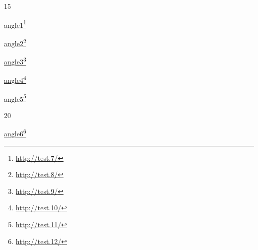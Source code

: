 15

\href{http://test.7/}{angle1}\footnote{\href{http://test.7/}{http://test.7/}}

\href{http://test.8/}{angle2}\footnote{\href{http://test.8/}{http://test.8/}}

\href{http://test.9/}{angle3}\footnote{\href{http://test.9/}{http://test.9/}}

\href{http://test.10/}{angle4}\footnote{\href{http://test.10/}{http://test.10/}}

\href{http://test.11/}{angle5}\footnote{\href{http://test.11/}{http://test.11/}}

20

\href{http://test.12/}{angle6}\footnote{\href{http://test.12/}{http://test.12/}}


